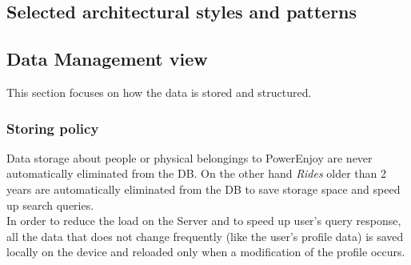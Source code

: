 \subsection{Selected architectural styles and patterns}
\newpage

\subsection{Data Management view}
\label{sec:DMV}
This section focuses on how the data is stored and structured.
\subsubsection{Storing policy}
Data storage about people or physical belongings to PowerEnjoy are never automatically eliminated from the DB. On the other hand \emph{Rides} older than 2 years are automatically eliminated from the DB to save storage space and 
speed up search queries.\\
In order to reduce the load on the Server and to speed up user’s query
response, all the data that does not change frequently (like the user’s profile
data) is saved locally on the device and reloaded only when a modification
of the profile occurs.

